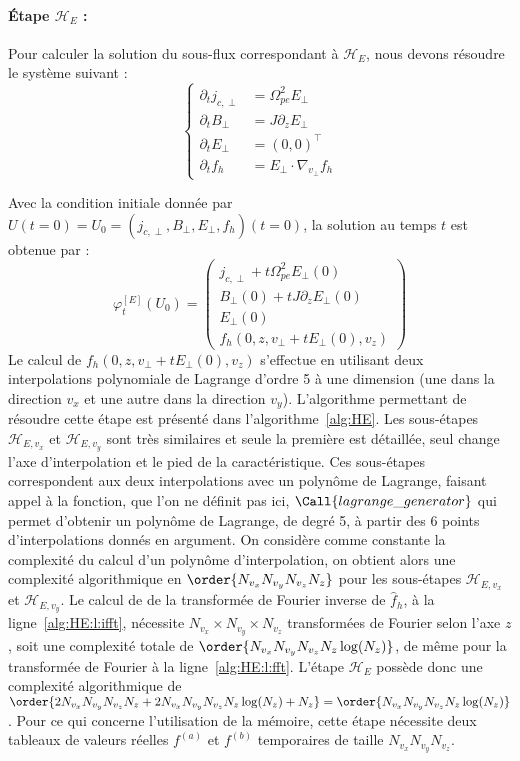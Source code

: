 \paragraph{Étape $\mathcal{H}_E$ :}
Pour calculer la solution du sous-flux correspondant à $\mathcal{H}_E$, nous devons résoudre le système suivant :
$$
  \begin{cases}
    \partial_t j_{c,\perp} &= \Omega_{pe}^2E_{\perp} \\
    \partial_t B_\perp     &= J\partial_zE_\perp \\
    \partial_t E_\perp     &= (0,0)^\top \\
    \partial_t f_h         &= E_\perp\cdot\nabla_{v_\perp}f_h
  \end{cases}
$$

Avec la condition initiale donnée par $U(t=0)=U_0=(j_{c,\perp},B_\perp,E_\perp,f_h)(t=0)$, la solution au temps $t$ est obtenue par :
$$
  \varphi_t^{[E]}(U_0) = \begin{pmatrix}
    j_{c,\perp} + t\Omega_{pe}^2E_{\perp}(0)\\
    B_\perp(0)+tJ\partial_zE_\perp(0) \\
    E_\perp(0) \\
    f_h(0,z,v_\perp+tE_\perp(0),v_z)
  \end{pmatrix}
$$
Le calcul de $f_h(0,z,v_\perp+tE_\perp(0),v_z)$ s'effectue en utilisant deux interpolations polynomiale de Lagrange d'ordre 5 à une dimension (une dans la direction $v_x$ et une autre dans la direction $v_y$). L'algorithme permettant de résoudre cette étape est présenté dans l'algorithme~\ref{alg:HE}. Les sous-étapes $\mathcal{H}_{E,v_x}$ et $\mathcal{H}_{E,v_y}$ sont très similaires et seule la première est détaillée, seul change l'axe d'interpolation et le pied de la caractéristique. Ces sous-étapes correspondent aux deux interpolations avec un polynôme de Lagrange, faisant appel à la fonction, que l'on ne définit pas ici, $\Call{lagrange\_generator}$ qui permet d'obtenir un polynôme de Lagrange, de degré 5, à partir des 6 points d'interpolations donnés en argument. On considère comme constante la complexité du calcul d'un polynôme d'interpolation, on obtient alors une complexité algorithmique en $\order{N_{v_x}N_{v_y}N_{v_z}N_z}$ pour les sous-étapes $\mathcal{H}_{E,{v_x}}$ et $\mathcal{H}_{E,{v_y}}$. Le calcul de de la transformée de Fourier inverse de $\hat{f}_h$, à la ligne~\ref{alg:HE:l:ifft}, nécessite $N_{v_x}\times N_{v_y}\times N_{v_z}$ transformées de Fourier selon l'axe $z$, soit une complexité totale de $\order{N_{v_x}N_{v_y}N_{v_z}N_z\log(N_z)}$, de même pour la transformée de Fourier à la ligne~\ref{alg:HE:l:fft}. L'étape $\mathcal{H}_{E}$ possède donc une complexité algorithmique de $\order{2N_{v_x}N_{v_y}N_{v_z}N_z + 2N_{v_x}N_{v_y}N_{v_z}N_z\log(N_z) + N_z} = \order{N_{v_x}N_{v_y}N_{v_z}N_z\log(N_z)}$. Pour ce qui concerne l'utilisation de la mémoire, cette étape nécessite deux tableaux de valeurs réelles $f^{(a)}$ et $f^{(b)}$ temporaires de taille $N_{v_x}N_{v_y}N_{v_z}$.
